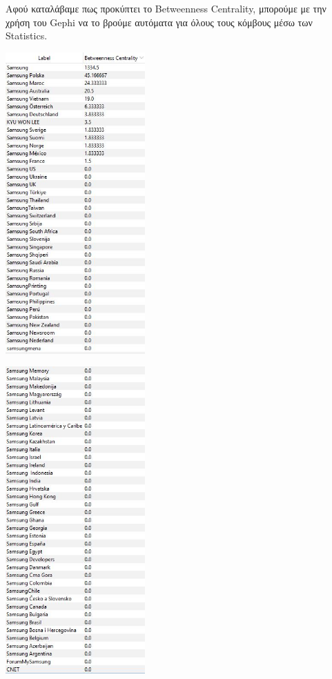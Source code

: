 \documentclass[12pt]{article}
\begin{document}
	\vspace{12pt}
	\vspace{12pt}
	Αφού καταλάβαμε πως προκύπτει το Betweenness Centrality, μπορούμε με την χρήση του Gephi να το βρούμε αυτόματα για όλους τους κόμβους μέσω των Statistics.
	\begin{center}
		\begin{adjustbox}{valign=t}
			\includegraphics[width=0.4\textwidth]{photos-files/section7/betweenness_centrality1.JPG}
		\end{adjustbox}
		\hfill
		\begin{adjustbox}{valign=t}
			\includegraphics[width=0.4\textwidth]{photos-files/section7/betweenness_centrality2.JPG}
		\end{adjustbox}
	\end{center}
\end{document}
